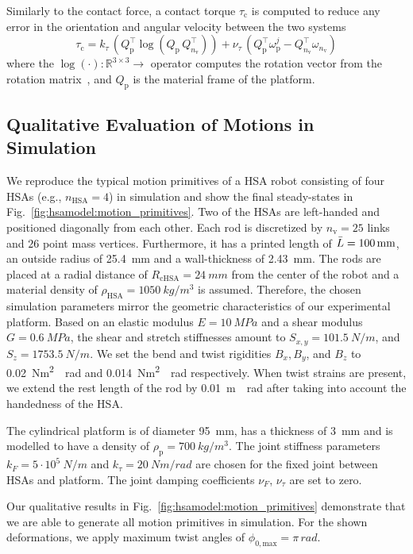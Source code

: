 Similarly to the contact force, a contact torque $\tau_\mathrm{c}$ is computed to reduce any error in the orientation and angular velocity between the two systems
\begin{equation}
    \tau_\mathrm{c} = k_\tau \, (Q_\mathrm{p}^\top \log(Q_\mathrm{p} \, Q_{n_\mathrm{v}}^\top)) + \nu_\tau \, (Q_\mathrm{p}^\top \omega_\mathrm{p}^j - Q_{n_\mathrm{v}}^\top \omega_{n_\mathrm{v}})
\end{equation}
where the $\log(\cdot): \mathbb{R}^{3 \times 3} \rightarrow $ operator computes the rotation vector from the rotation matrix~\citep{gazzola2018forward}, and $Q_\mathrm{p}$ is the material frame of the platform.

\subsection{Qualitative Evaluation of Motions in Simulation}\label{sub:hsamodel:hsa_robot_simulation:motion_primitives}
We reproduce the typical motion primitives of a \gls{HSA} robot consisting of four \glspl{HSA} (e.g., $n_\mathrm{HSA} = 4$) in simulation and show the final steady-states in Fig.~\ref{fig:hsamodel:motion_primitives}. Two of the \glspl{HSA} are left-handed and positioned diagonally from each other. 
Each rod is discretized by $n_\mathrm{v} = 25$ links and $26$ point mass vertices. Furthermore, it has a printed length of $\Bar{L} = \SI{100}{mm}$, an outside radius of \SI{25.4}{mm} and a wall-thickness of \SI{2.43}{mm}. The rods are placed at a radial distance of $R_\mathrm{cHSA} = \SI{24}{mm}$ from the center of the robot and a material density of $\rho_\mathrm{HSA} = \SI{1050}{kg \per m^3}$ is assumed. Therefore, the chosen simulation parameters mirror the geometric characteristics of our experimental platform.
Based on an elastic modulus $E=\SI{10}{MPa}$ and a shear modulus $G=\SI{0.6}{MPa}$, the shear and stretch stiffnesses amount to $S_{x,y} = \SI{101.5}{N \per m}$, and $S_z = \SI{1753.5}{N \per m}$.
We set the bend and twist rigidities $B_{x}, B_y$, and $B_z$ to \SI{0.02}{Nm^2 \per rad} and \SI{0.014}{Nm^2 \per rad} respectively. When twist strains are present, we extend the rest length of the rod by \SI{0.01}{m \per rad} after taking into account the handedness of the \gls{HSA}.

The cylindrical platform is of diameter \SI{95}{mm}, has a thickness of \SI{3}{mm} and is modelled to have a density of $\rho_\mathrm{p} = \SI{700}{kg / m^3}$.
The joint stiffness parameters $k_F = 5\cdot 10^5 \: \si{N \per m}$ and $k_\tau = 20 \: \si{Nm \per rad}$ are chosen for the fixed joint between \glspl{HSA} and platform. The joint damping coefficients $\nu_F$, $\nu_\tau$ are set to zero.

Our qualitative results in Fig.~\ref{fig:hsamodel:motion_primitives} demonstrate that we are able to generate all motion primitives in simulation. For the shown deformations, we apply maximum twist angles of $\phi_{0,\mathrm{max}} = \pi \, \si{rad}$. %